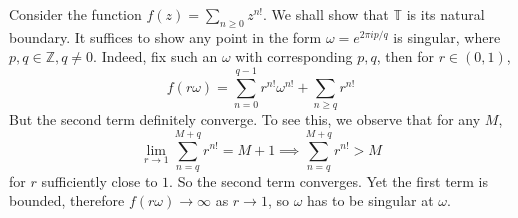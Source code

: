 \begin{example}
    Consider the function $f(z)=\sum_{n\ge 0}z^{n!}$.
    We shall show that $\mathbb T$ is its natural boundary.
    It suffices to show any point in the form $\omega=e^{2\pi ip/q}$ is singular, where $p,q\in\mathbb Z,q\neq 0$.
    Indeed, fix such an $\omega$ with corresponding $p,q$, then for $r\in(0,1)$,
    $$f(r\omega)=\sum_{n=0}^{q-1}r^{n!}\omega^{n!}+\sum_{n\ge q}r^{n!}$$
    But the second term definitely converge.
    To see this, we observe that for any $M$,
    $$\lim_{r\to 1}\sum_{n=q}^{M+q}r^{n!}=M+1\implies \sum_{n=q}^{M+q}r^{n!}>M$$
    for $r$ sufficiently close to $1$.
    So the second term converges.
    Yet the first term is bounded, therefore $f(r\omega)\to\infty$ as $r\to1$, so $\omega$ has to be singular at $\omega$.
\end{example}